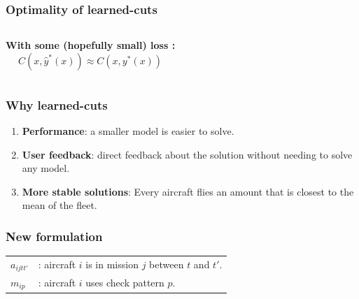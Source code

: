 \begin{frame}
\frametitle{\textbf{Optimality of learned-cuts}}

  \begin{columns}[c]
    \textbf{With some (hopefully small) loss :}
    \begin{equation*}
      C(x,\hat{y}^{*}(x)) \approx  C(x,y^{*}(x))
    \end{equation*}
  \end{columns}
\end{frame}

\begin{frame}
\frametitle{\textbf{Why learned-cuts}}

  \begin{enumerate}[<+->]

  \item
    \textbf{Performance}: a smaller model is easier to solve.
  \item
    \textbf{User feedback}: direct feedback about the solution without
    needing to solve any model.
  \item
    \textbf{More stable solutions}: Every aircraft flies an amount that is
    closest to the mean of the fleet.
  \end{enumerate}
\end{frame}

\begin{frame}
\frametitle{\textbf{New formulation}}

  \begin{tabular}{p{5mm}p{90mm}}
    $a_{ijtt'}$ & : aircraft $i$ is in mission $j$ between $t$ and $t'$.  \\
    $m_{ip}$ &: aircraft $i$ uses check pattern $p$. \\
  \end{tabular}



\end{frame}


